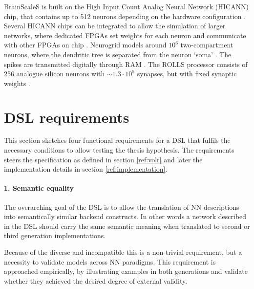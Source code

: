 \documentclass[report.tex]{subfiles}
\begin{document}
BrainScaleS is built on the High Input Count Analog Neural Network (HICANN)
chip, that contains up to 512 neurons depending on the hardware configuration 
\cite{Pfeil2013}.
Several HICANN chips can be integrated to allow the simulation of larger
networks, where dedicated \gls{FPGA}s set weights for each neuron and
communicate with other FPGAs on chip \cite{Walter2015}. 
Neurogrid models around $10^6$ two-compartment neurons, where the dendritic
tree is separated from the neuron `soma' \cite{Walter2015}.
The spikes are transmitted digitally through \gls{RAM} \cite{Walter2015}.
The ROLLS processor consists of 256 analogue silicon neurons with
$\sim1.3 \cdot 10^5$ synapses, but with fixed synaptic weights
\cite{Walter2015}.

%
%

\section{DSL requirements} \label{sec:requirements}
This section sketches four functional requirements for a \gls{DSL} that 
fulfils the necessary conditions to allow testing the thesis hypothesis.
The requirements steers the specification as defined in section 
\ref{ref:volr} and later the implementation details in section
\ref{ref:implementation}.

\paragraph{1. Semantic equality}
The overarching goal of the \gls{DSL} is to allow the translation 
of \gls{NN} descriptions into semantically similar backend constructs.
In other words a network described in the \gls{DSL} should carry
the same semantic meaning when translated to second or third generation
implementations. 

Because of the diverse and incompatible this is a non-trivial requirement,
but a necessity to validate models across \gls{NN} paradigms.
This requirement is approached empirically, by illustrating examples in
both generations and validate whether they achieved the desired degree
of external validity.
\end{document}
